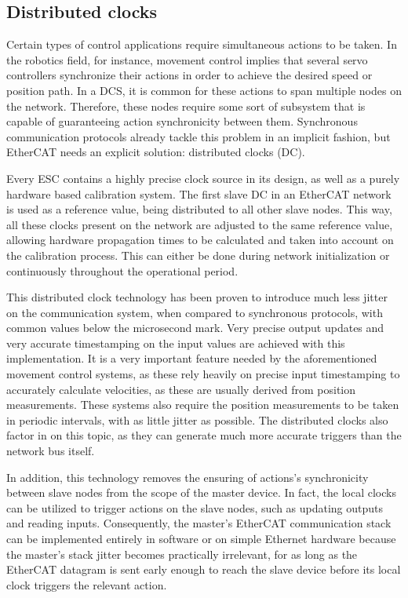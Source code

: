 \subsection{Distributed clocks}

Certain types of control applications require simultaneous actions to be taken.
In the robotics field, for instance, movement control implies that several servo controllers synchronize their actions in order to  achieve the desired speed or position path.
In a DCS, it is common for these actions to span multiple nodes on the network.
Therefore, these nodes require some sort of subsystem that is capable of guaranteeing action synchronicity between them.
Synchronous communication protocols already tackle this problem in an implicit fashion, but EtherCAT needs an explicit solution: distributed clocks (DC).

Every ESC contains a highly precise clock source in its design, as well as a purely hardware based calibration system.
The first slave DC in an EtherCAT network is used as a reference value, being distributed to all other slave nodes.
This way, all these clocks present on the network are adjusted to the same reference value, allowing hardware propagation times to be calculated and taken into account on the calibration process.
This can either be done during network initialization or continuously throughout the operational period.

This distributed clock technology has been proven to introduce much less jitter on the communication system, when compared to synchronous protocols, with common values below the microsecond mark.
Very precise output updates and very accurate timestamping on the input values are achieved with this implementation.
It is a very important feature needed by the aforementioned movement control systems, as these rely heavily on precise input timestamping to accurately calculate velocities, as these are usually derived from position measurements.
These systems also require the position measurements to be taken in periodic intervals, with as little jitter as possible.
The distributed clocks also factor in on this topic, as they can generate much more accurate triggers than the network bus itself.

In addition, this technology removes the ensuring of actions's synchronicity between slave nodes from the scope of the master device.
In fact, the local clocks can be utilized to trigger actions on the slave nodes, such as updating outputs and reading inputs.
Consequently, the master's EtherCAT communication stack can be implemented entirely in software or on simple Ethernet hardware because the master's stack jitter becomes practically irrelevant, for as long as the EtherCAT datagram is sent early enough to reach the slave device before its local clock triggers the relevant action.

